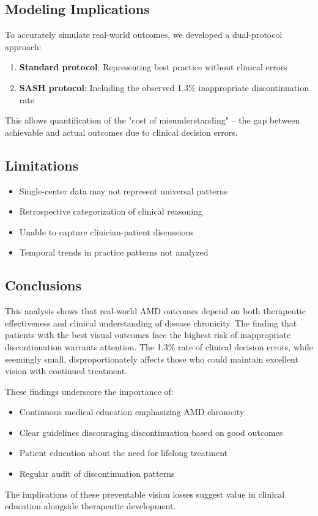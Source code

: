 \subsection{Modeling Implications}

To accurately simulate real-world outcomes, we developed a dual-protocol approach:

\begin{enumerate}
    \item \textbf{Standard protocol}: Representing best practice without clinical errors
    \item \textbf{SASH protocol}: Including the observed 1.3\% inappropriate discontinuation rate
\end{enumerate}

This allows quantification of the "cost of misunderstanding" – the gap between achievable and actual outcomes due to clinical decision errors.

\subsection{Limitations}

\begin{itemize}
    \item Single-center data may not represent universal patterns
    \item Retrospective categorization of clinical reasoning
    \item Unable to capture clinician-patient discussions
    \item Temporal trends in practice patterns not analyzed
\end{itemize}

\subsection{Conclusions}

This analysis shows that real-world AMD outcomes depend on both therapeutic effectiveness and clinical understanding of disease chronicity. The finding that patients with the best visual outcomes face the highest risk of inappropriate discontinuation warrants attention. The 1.3\% rate of clinical decision errors, while seemingly small, disproportionately affects those who could maintain excellent vision with continued treatment.

These findings underscore the importance of:
\begin{itemize}
    \item Continuous medical education emphasizing AMD chronicity
    \item Clear guidelines discouraging discontinuation based on good outcomes
    \item Patient education about the need for lifelong treatment
    \item Regular audit of discontinuation patterns
\end{itemize}

The implications of these preventable vision losses suggest value in clinical education alongside therapeutic development.